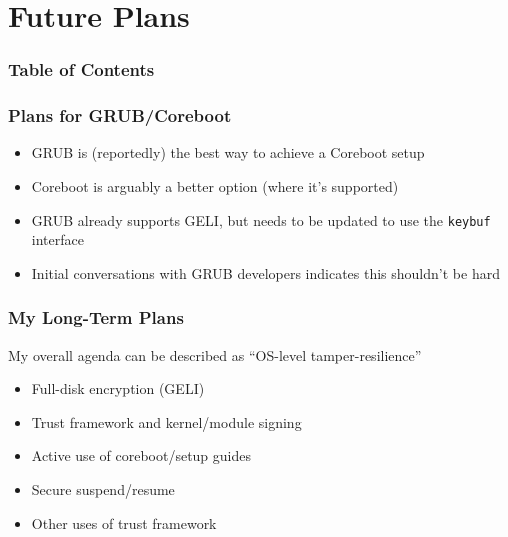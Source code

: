 \documentclass{beamer}
\begin{document}
\section{Future Plans}

\begin{frame}
  \frametitle{Table of Contents}
  \tableofcontents[currentsection]
\end{frame}

\begin{frame}
  \frametitle{Plans for GRUB/Coreboot}
  \begin{itemize}
  \item GRUB is (reportedly) the best way to achieve a Coreboot setup
  \item Coreboot is arguably a better option (where it's supported)
  \item GRUB already supports GELI, but needs to be updated to use the
    \texttt{keybuf} interface
  \item Initial conversations with GRUB developers indicates this
    shouldn't be hard
  \end{itemize}
\end{frame}

\begin{frame}
  \frametitle{My Long-Term Plans}

  My overall agenda can be described as ``OS-level tamper-resilience''
  \begin{itemize}
  \item Full-disk encryption (GELI)
  \item Trust framework and kernel/module signing
  \item Active use of coreboot/setup guides
  \item Secure suspend/resume
  \item Other uses of trust framework
  \end{itemize}
\end{frame}
\end{document}
